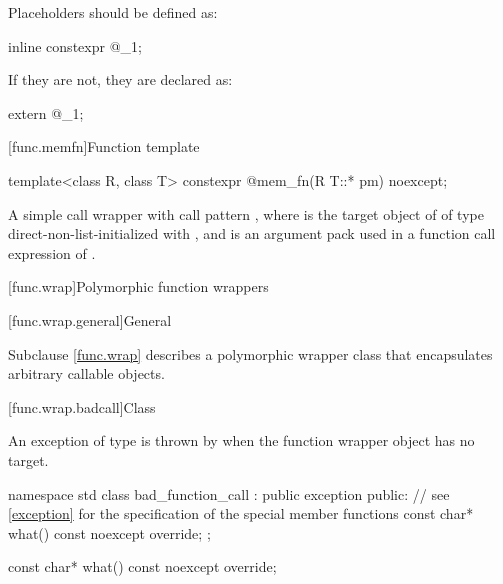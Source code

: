 \pnum
Placeholders should be defined as:
\begin{codeblock}
inline constexpr @\unspec@ _1{};
\end{codeblock}
If they are not, they are declared as:
\begin{codeblock}
extern @\unspec@ _1;
\end{codeblock}%

[func.memfn]{Function template }%

%
\begin{itemdecl}
template<class R, class T> constexpr @\unspec@ mem_fn(R T::* pm) noexcept;
\end{itemdecl}

\begin{itemdescr}
\pnum
\returns
A simple call wrapper 
with call pattern , where
 is the target object of  of type 
direct-non-list-initialized with , and
 is an argument pack
used in a function call expression of .
\end{itemdescr}

[func.wrap]{Polymorphic function wrappers}%

[func.wrap.general]{General}%

\pnum
Subclause \ref{func.wrap} describes a polymorphic wrapper class that
encapsulates arbitrary callable objects.

[func.wrap.badcall]{Class }%
%

\pnum
An exception of type  is thrown by
when the function wrapper object has no target.

\begin{codeblock}
namespace std {
  class bad_function_call : public exception {
  public:
    // see \ref{exception} for the specification of the special member functions
    const char* what() const noexcept override;
  };
}
\end{codeblock}

%
\begin{itemdecl}
const char* what() const noexcept override;
\end{itemdecl}

